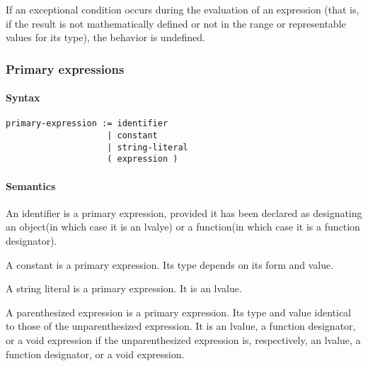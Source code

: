 \documentclass{article}
\begin{document}
If an exceptional condition occurs during the evaluation of an expression (that is, if 
the result is not mathematically defined or not in the range or representable values for 
its type), the behavior is undefined.

\subsubsection{Primary expressions}
\paragraph*{Syntax}
\begin{lstlisting}[language=bnf]
primary-expression := identifier
                    | constant
                    | string-literal
                    ( expression )
\end{lstlisting}
\paragraph*{Semantics}
An identifier is a primary expression, provided it has been declared as designating an 
object(in which case it is an lvalye) or a function(in which case it is a function 
designator).
\linebreak

A constant is a primary expression. Its type depends on its form and value.
\linebreak

A string literal is a primary expression.  It is an lvalue.
\linebreak

A parenthesized expression is a primary expression.  Its type and value identical to 
those of the unparenthesized expression.  It is an lvalue, a function designator, or a 
void expression if the unparenthesized expression is, respectively, an lvalue, a 
function designator, or a void expression.



\end{document}

